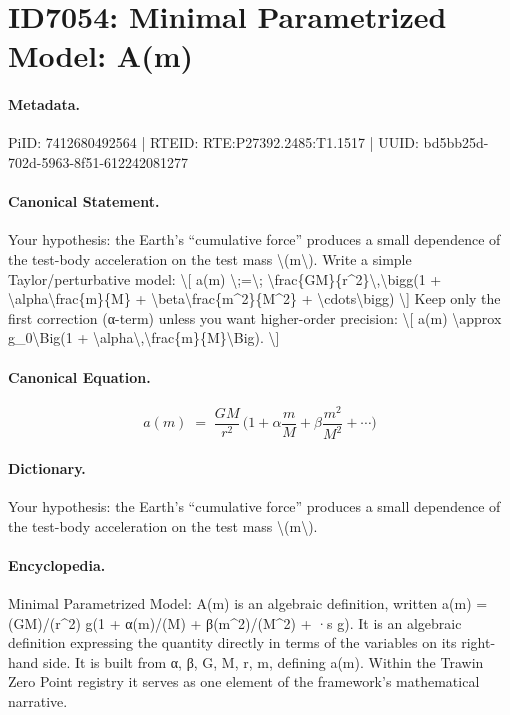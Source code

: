 \section*{ID7054: Minimal Parametrized Model: A(m)}
\paragraph{Metadata.}
PiID: 7412680492564 | RTEID: RTE:P27392.2485:T1.1517 | UUID: bd5bb25d-702d-5963-8f51-612242081277

\paragraph{Canonical Statement.}
Your hypothesis: the Earth’s “cumulative force” produces a small dependence of the test-body acceleration on the test mass \textbackslash{}(m\textbackslash{}). Write a simple Taylor/perturbative model: \textbackslash{}[ a(m) \textbackslash{};=\textbackslash{}; \textbackslash{}frac\{GM\}\{r\textasciicircum{}2\}\textbackslash{},\textbackslash{}bigg(1 + \textbackslash{}alpha\textbackslash{}frac\{m\}\{M\} + \textbackslash{}beta\textbackslash{}frac\{m\textasciicircum{}2\}\{M\textasciicircum{}2\} + \textbackslash{}cdots\textbackslash{}bigg) \textbackslash{}] Keep only the first correction (α-term) unless you want higher-order precision: \textbackslash{}[ a(m) \textbackslash{}approx g\_0\textbackslash{}Big(1 + \textbackslash{}alpha\textbackslash{},\textbackslash{}frac\{m\}\{M\}\textbackslash{}Big). \textbackslash{}]

\paragraph{Canonical Equation.}
\[
a(m) \;=\; \frac{GM}{r^2}\,\bigg(1 + \alpha\frac{m}{M} + \beta\frac{m^2}{M^2} + \cdots\bigg)
\]

\paragraph{Dictionary.}
Your hypothesis: the Earth’s “cumulative force” produces a small dependence of the test-body acceleration on the test mass \textbackslash{}(m\textbackslash{}).

\paragraph{Encyclopedia.}
Minimal Parametrized Model: A(m) is an algebraic definition, written a(m) = (GM)/(r\textasciicircum{}2) g(1 + α(m)/(M) + β(m\textasciicircum{}2)/(M\textasciicircum{}2) + ·s g). It is an algebraic definition expressing the quantity directly in terms of the variables on its right-hand side. It is built from α, β, G, M, r, m, defining a(m). Within the Trawin Zero Point registry it serves as one element of the framework's mathematical narrative.
